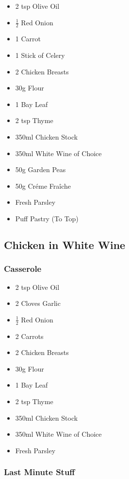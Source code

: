 \documentclass[11pt, english]{article}
\begin{document}
	\begin{itemize}
	\setlength\itemsep{0cm}
		\item 2 tsp Olive Oil
		\item $\frac{1}{2}$ Red Onion
		\item 1 Carrot
		\item 1 Stick of Celery
		\item 2 Chicken Breasts
		\item 30g Flour
		\item 1 Bay Leaf
		\item 2 tsp Thyme
		\item 350ml Chicken Stock
		\item 350ml White Wine of Choice
		\item 50g Garden Peas
		\item 50g Cr\'{e}me Fra\^{i}che
		\item Fresh Parsley
		\item Puff Pastry (To Top)
	\end{itemize}

\newpage

	\subsection{Chicken in White Wine}

		\subsubsection*{Casserole}

	\begin{itemize}
	\setlength\itemsep{0cm}
		\item 2 tsp Olive Oil
		\item 2 Cloves Garlic
		\item $\frac{1}{2}$ Red Onion
		\item 2 Carrots
		\item 2 Chicken Breasts
		\item 30g Flour
		\item 1 Bay Leaf
		\item 2 tsp Thyme
		\item 350ml Chicken Stock
		\item 350ml White Wine of Choice
		\item Fresh Parsley
	\end{itemize}

		\subsubsection*{Last Minute Stuff}
\end{document}
